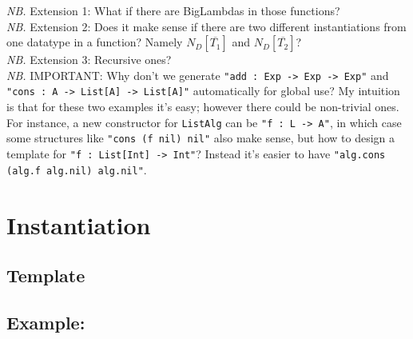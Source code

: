 \documentclass{article}
\newcommand{\nb}{\textit{NB. }}
\begin{document}
\begin{spacing}{1.1}
\nb Extension 1: What if there are BigLambdas in those functions?\\

\nb Extension 2: Does it make sense if there are two different instantiations from one datatype in a function? Namely $N_D[\overline{T_1}]$ and $N_D[\overline{T_2}]$?\\

\nb Extension 3: Recursive ones?\\

\nb IMPORTANT: Why don't we generate \lstinline{"add : Exp -> Exp -> Exp"} and \lstinline{"cons : A -> List[A] -> List[A]"} automatically for global use? My intuition is that for these two examples it's easy; however there could be non-trivial ones. For instance, a new constructor for \lstinline{ListAlg} can be \lstinline{"f : L -> A"}, in which case some structures like \lstinline{"cons (f nil)}\lstinline{ nil"} also make sense, but how to design a template for \lstinline{"f : List[Int] -> Int"}? Instead it's easier to have \lstinline{"alg.cons (alg.f alg.nil)}\lstinline{ alg.nil"}.

\section{Instantiation}

\subsection{Template}

\subsection{Example: }



\end{spacing}
\end{document}
